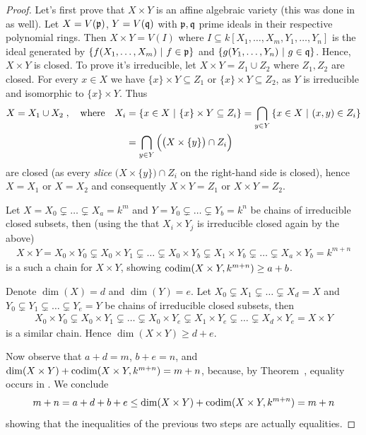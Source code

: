 \documentclass[a4paper,parskip=half,numbers=enddot, DIV=12]{scrreprt}
\begin{document}
\begin{proof}
	Let's first prove that $X\times Y$ is an affine algebraic variety (this was done in \cite[proof of Proposition~2.2.6]{alg1} as well). Let $X=V(\mathfrak{p})$, $Y=V(\mathfrak{q})$ with $\mathfrak{p},\mathfrak{q}$ prime ideals in their respective polynomial rings. Then $X\times Y=V(I)$ where $I\subseteq k[X_1,\ldots,X_m,Y_1,\ldots,Y_n]$ is  the ideal generated by $\left\{f(X_1,\ldots,X_m)\ \middle|\  f\in\mathfrak{p}\right\}$ and $\left\{g(Y_1,\ldots,Y_n)\ \middle|\  g\in\mathfrak{q}\right\}$. Hence, $X\times Y$ is closed.
    To prove it's irreducible, let $X\times Y = Z_1\cup Z_2$ where $Z_1,Z_2$ are closed. For every $x\in X$ we have $\{x\}\times Y\subseteq Z_1$ or $\{x\}\times Y\subseteq Z_2$, as $Y$ is irreducible and isomorphic to $\{x\}\times Y$. Thus 
    \begin{align*}
    	X= X_1\cup X_2\;,\quad\text{where}\quad X_i&=\left\{x\in X\ \middle|\  \{x\}\times Y\subseteq Z_i\right\} = \bigcap_{y\in Y}\left\{x\in X\ \middle|\  (x,y)\in Z_i\right\}\\
    	&=\bigcap_{y\in Y} \Big(\big(X\times\{y\}\big)\cap Z_i\Big)
    \end{align*}
    are closed (as every \emph{slice} $\big(X\times\{y\}\big)\cap Z_i$ on the right-hand side is closed), hence $X=X_1$ or $X=X_2$ and consequently $X\times Y = Z_1$ or $X\times Y=Z_2$.
    
	Let $X= X_0\subsetneq \ldots\subsetneq X_a=k^m$ and $Y= Y_0\subsetneq \ldots\subsetneq Y_b=k^n$ be chains of irreducible closed subsets, then (using the that $X_i\times Y_j$ is irreducible closed again by the above)
    \begin{align*}
        X\times Y = X_0\times Y_0 \subsetneq X_0\times Y_1\subsetneq\ldots\subsetneq X_0\times Y_b\subsetneq X_1\times Y_b\subsetneq \ldots\subsetneq X_a\times Y_b = k^{m+n}
    \end{align*}
    is a such a chain for $X\times Y$, showing $\operatorname{codim}(X\times Y,k^{m+n})\geq a+b$.
    
	Denote $\dim (X)=d$ and $\dim (Y)=e$. Let $X_0\subsetneq X_1\subsetneq \ldots\subsetneq X_d=X$ and $Y_0\subsetneq Y_1\subsetneq \ldots\subsetneq Y_e=Y$ be chains of irreducible closed subsets, then 
    \begin{align*}
        X_0\times Y_0 \subsetneq X_0\times Y_1\subsetneq\ldots\subsetneq X_0\times Y_e\subsetneq X_1\times Y_e\subsetneq \ldots\subsetneq X_d\times Y_e =X \times Y
    \end{align*}
    is a similar chain. Hence $\dim(X\times Y)\geq d+e$.
    
    Now observe that $a+d=m$, $b+e=n$, and $\dim(X\times Y)+\operatorname{codim}(X\times Y,k^{m+n}) = m+n$, because, by Theorem~, equality occurs in . We conclude
    \begin{align*}
        m+n = a+d+b+e \leq \dim(X\times Y) +\operatorname{codim}(X\times Y,k^{m+n}) = m+n
    \end{align*}
    showing that the inequalities of the previous two steps are actually equalities.
\end{proof}
\end{document}
